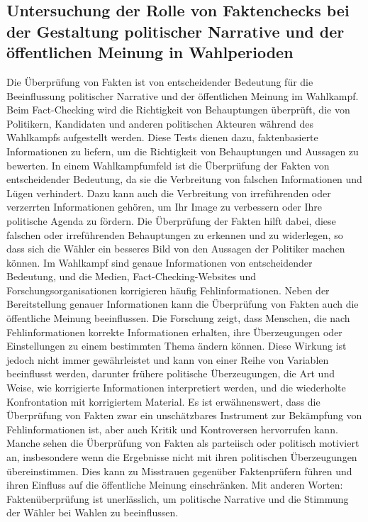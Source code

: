 \documentclass[a4paper,listof=totoc,bibliography=totoc]{scrartcl}
\begin{document}
\subsection{Untersuchung der Rolle von Faktenchecks bei der Gestaltung politischer Narrative und der öffentlichen Meinung in Wahlperioden}
Die Überprüfung von Fakten ist von entscheidender Bedeutung für die Beeinflussung politischer Narrative und der öffentlichen Meinung im Wahlkampf. Beim Fact-Checking wird 
die Richtigkeit von Behauptungen überprüft, die von Politikern, Kandidaten und anderen politischen Akteuren während des Wahlkampfs aufgestellt werden. Diese Tests dienen dazu, 
faktenbasierte Informationen zu liefern, um die Richtigkeit von Behauptungen und Aussagen zu bewerten. In einem Wahlkampfumfeld ist die Überprüfung der Fakten von 
entscheidender Bedeutung, da sie die Verbreitung von falschen Informationen und Lügen verhindert. Dazu kann auch die Verbreitung von irreführenden oder verzerrten Informationen 
gehören, um Ihr Image zu verbessern oder Ihre politische Agenda zu fördern. Die Überprüfung der Fakten hilft dabei, diese falschen oder irreführenden Behauptungen zu erkennen 
und zu widerlegen, so dass sich die Wähler ein besseres Bild von den Aussagen der Politiker machen können. Im Wahlkampf sind genaue Informationen von entscheidender Bedeutung, 
und die Medien, Fact-Checking-Websites und Forschungsorganisationen korrigieren häufig Fehlinformationen. Neben der Bereitstellung genauer Informationen kann die Überprüfung von 
Fakten auch die öffentliche Meinung beeinflussen. Die Forschung zeigt, dass Menschen, die nach Fehlinformationen korrekte Informationen erhalten, ihre Überzeugungen oder 
Einstellungen zu einem bestimmten Thema ändern können. Diese Wirkung ist jedoch nicht immer gewährleistet und kann von einer Reihe von Variablen beeinflusst werden, darunter 
frühere politische Überzeugungen, die Art und Weise, wie korrigierte Informationen interpretiert werden, und die wiederholte Konfrontation mit korrigiertem Material. 
Es ist erwähnenswert, dass die Überprüfung von Fakten zwar ein unschätzbares Instrument zur Bekämpfung von Fehlinformationen ist, aber auch Kritik und Kontroversen hervorrufen 
kann. Manche sehen die Überprüfung von Fakten als parteiisch oder politisch motiviert an, insbesondere wenn die Ergebnisse nicht mit ihren politischen Überzeugungen übereinstimmen. 
Dies kann zu Misstrauen gegenüber Faktenprüfern führen und ihren Einfluss auf die öffentliche Meinung einschränken. Mit anderen Worten: Faktenüberprüfung ist unerlässlich, um 
politische Narrative und die Stimmung der Wähler bei Wahlen zu beeinflussen.
\end{document}
